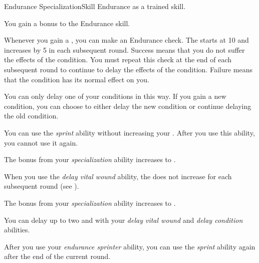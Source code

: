     \begin{feat}{Endurance Specialization}{Skill}
        \featpre Endurance as a trained skill.

         You gain a  bonus to the Endurance skill.

         Whenever you gain a , you can make an Endurance check.
        The  starts at 10 and increases by 5 in each subsequent round.
        Success means that you do not suffer the effects of the condition.
        You must repeat this check at the end of each subsequent round to continue to delay the effects of the condition.
        Failure means that the condition has its normal effect on you.

        You can only delay one of your conditions in this way.
        If you gain a new condition, you can choose to either delay the new condition or continue delaying the old condition.

         You can use the \textit{sprint} ability without increasing your .
        After you use this ability, you  cannot use it again.

         The bonus from your \textit{specialization} ability increases to .

        When you use the \textit{delay vital wound} ability, the  does not increase for each subsequent round (see ).

         The bonus from your \textit{specialization} ability increases to .

         You can delay up to two  and  with your \textit{delay vital wound} and \textit{delay condition} abilities.

         After you use your \textit{endurance sprinter} ability, you can use the \textit{sprint} ability again after the end of the current round.
    \end{feat}

